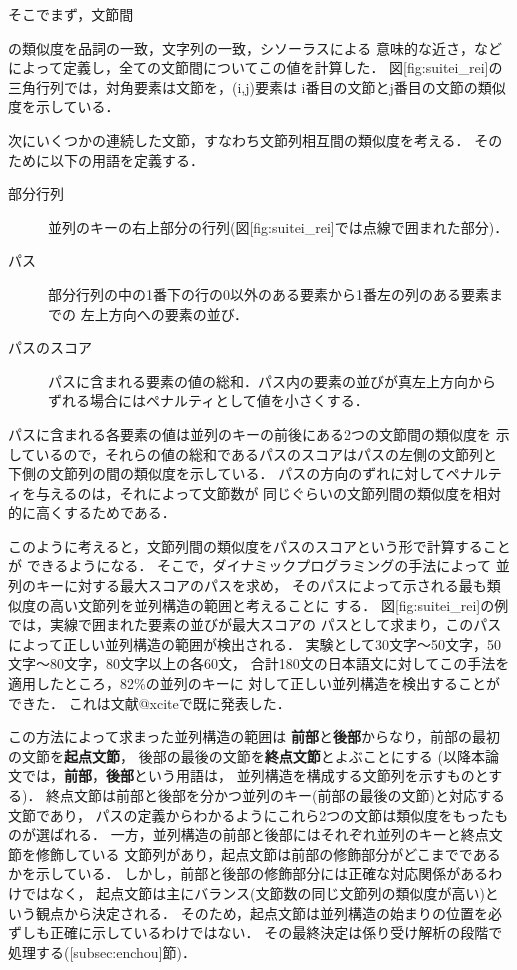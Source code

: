 そこでまず，文節間

の類似度を品詞の一致，文字列の一致，シソーラスによる
意味的な近さ，などによって定義し，全ての文節間についてこの値を計算した．
図[fig:suitei_rei]の三角行列では，対角要素は文節を，(i,j)要素は
i番目の文節とj番目の文節の類似度を示している．

次にいくつかの連続した文節，すなわち文節列相互間の類似度を考える．
そのために以下の用語を定義する．
\begin{description}
  \item[部分行列] 
並列のキーの右上部分の行列(図[fig:suitei_rei]では点線で囲まれた部分)．
  \item[パス] 
部分行列の中の1番下の行の0以外のある要素から1番左の列のある要素までの
左上方向への要素の並び．
  \item[パスのスコア] 
パスに含まれる要素の値の総和．パス内の要素の並びが真左上方向から
ずれる場合にはペナルティとして値を小さくする．
\end{description}
パスに含まれる各要素の値は並列のキーの前後にある2つの文節間の類似度を
示しているので，それらの値の総和であるパスのスコアはパスの左側の文節列と
下側の文節列の間の類似度を示している．
パスの方向のずれに対してペナルティを与えるのは，それによって文節数が
同じぐらいの文節列間の類似度を相対的に高くするためである．

このように考えると，文節列間の類似度をパスのスコアという形で計算することが
できるようになる．
そこで，ダイナミックプログラミングの手法によって
並列のキーに対する最大スコアのパスを求め，
そのパスによって示される最も類似度の高い文節列を並列構造の範囲と考えることに
する．
図[fig:suitei_rei]の例では，実線で囲まれた要素の並びが最大スコアの
パスとして求まり，このパスによって正しい並列構造の範囲が検出される．
実験として30文字〜50文字，50文字〜80文字，80文字以上の各60文，
合計180文の日本語文に対してこの手法を適用したところ，82\%の並列のキーに
対して正しい並列構造を検出することができた．
これは文献@xciteで既に発表した．

この方法によって求まった並列構造の範囲は
{\bf 前部}と{\bf 後部}からなり，前部の最初の文節を{\bf 起点文節}，
後部の最後の文節を{\bf 終点文節}とよぶことにする
(以降本論文では，{\bf 前部}，{\bf 後部}という用語は，
並列構造を構成する文節列を示すものとする)．
終点文節は前部と後部を分かつ並列のキー(前部の最後の文節)と対応する文節であり，
パスの定義からわかるようにこれら2つの文節は類似度をもったものが選ばれる．
一方，並列構造の前部と後部にはそれぞれ並列のキーと終点文節を修飾している
文節列があり，起点文節は前部の修飾部分がどこまでであるかを示している．
しかし，前部と後部の修飾部分には正確な対応関係があるわけではなく，
起点文節は主にバランス(文節数の同じ文節列の類似度が高い)という観点から決定される．
そのため，起点文節は並列構造の始まりの位置を必ずしも正確に示しているわけではない．
その最終決定は係り受け解析の段階で処理する([subsec:enchou]節)．

